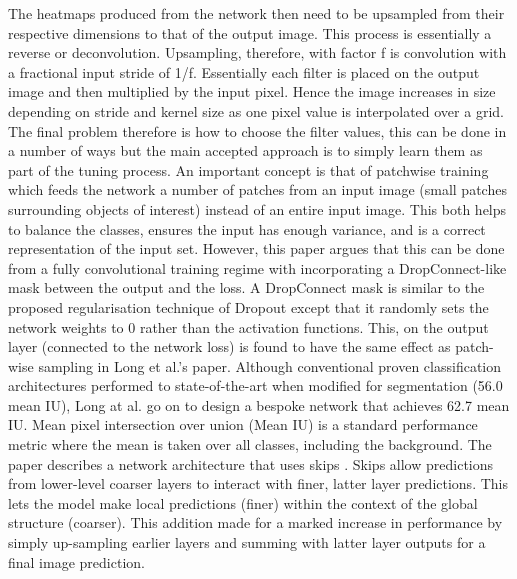 \documentclass[a4paper,11pt,notitlepage]{article}
\begin{document}
The heatmaps produced from the network then need to be upsampled from their respective dimensions to that of the output image. This process is essentially a reverse or deconvolution. Upsampling, therefore, with factor f is convolution with a fractional input stride of 1/f. Essentially each filter is placed on the output image and then multiplied by the input pixel. Hence the image increases in size depending on stride and kernel size as one pixel value is interpolated over a grid. The final problem therefore is how to choose the filter values, this can be done in a number of ways but the main accepted approach is to simply learn them as part of the tuning process.
\newline \newline
An important concept is that of patchwise training which feeds the network a number of patches from an input image (small patches surrounding objects of interest) instead of an entire input image. This both helps to balance the classes, ensures the input has enough variance, and is a correct representation of the input set. However, this paper argues that this can be done from a fully convolutional training regime with incorporating a DropConnect-like mask \cite{Wan:2013:RNN:3042817.3043055} between the output and the loss. A DropConnect mask is similar to the proposed regularisation technique of Dropout \cite{JMLR:v15:srivastava14a} except that it randomly sets the network weights to 0 rather than the activation functions. This, on the output layer (connected to the network loss) is found to have the same effect as patch-wise sampling in Long et al.'s paper.
\newline \newline
Although conventional proven classification architectures performed to state-of-the-art when modified for segmentation (56.0 mean IU), Long at al. \cite{DBLP:journals/corr/LongSD14} go on to design a bespoke network that achieves 62.7 mean IU. Mean pixel intersection over union (Mean IU) is a standard performance metric where the mean is taken over all classes, including the background. The paper describes a network architecture that uses skips \cite{Bishop:2006:PRM:1162264}. Skips allow predictions from lower-level coarser layers to interact with finer, latter layer predictions. This lets the model make local predictions (finer) within the context of the global structure (coarser). This addition made for a marked increase in performance by simply up-sampling earlier layers and summing with latter layer outputs for a final image prediction.
\end{document}
